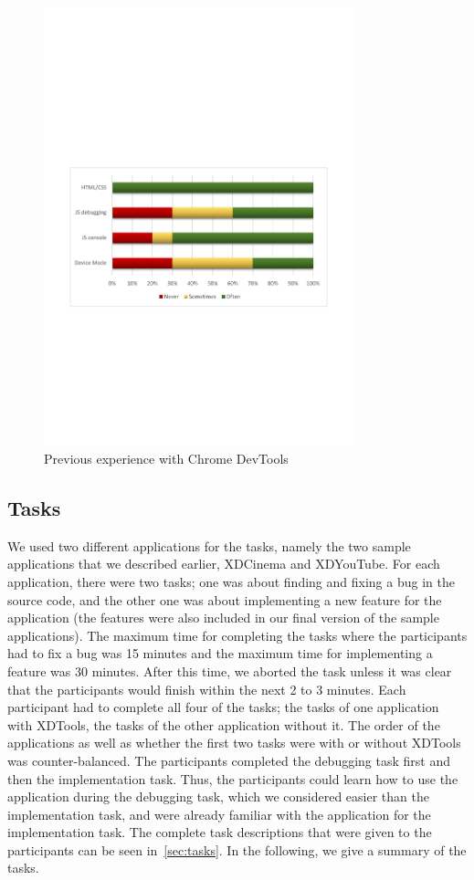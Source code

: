\begin{figure}[ht!]
  \centering
    \includegraphics[width=0.8\textwidth]{images/charts/devtools_xp.pdf}
	\caption[Previous experience with Chrome DevTools]{Previous experience with Chrome DevTools}
	\label{fig:devtools_xp}
\end{figure}

\subsection{Tasks}

We used two different applications for the tasks, namely the two sample applications that we described earlier, XDCinema and XDYouTube. For each application, there were two tasks; one was about finding and fixing a bug in the source code, and the other one was about implementing a new feature for the application (the features were also included in our final version of the sample applications). The maximum time for completing the tasks where the participants had to fix a bug was 15 minutes and the maximum time for implementing a feature was 30 minutes. After this time, we aborted the task unless it was clear that the participants would finish within the next 2 to 3 minutes. Each participant had to complete all four of the tasks; the tasks of one application with XDTools, the tasks of the other application without it. The order of the applications as well as whether the first two tasks were with or without XDTools was counter-balanced. The participants completed the debugging task first and then the implementation task. Thus, the participants could learn how to use the application during the debugging task, which we considered easier than the implementation task, and were already familiar with the application for the implementation task. The complete task descriptions that were given to the participants can be seen in~\ref{sec:tasks}. In the following, we give a summary of the tasks.

